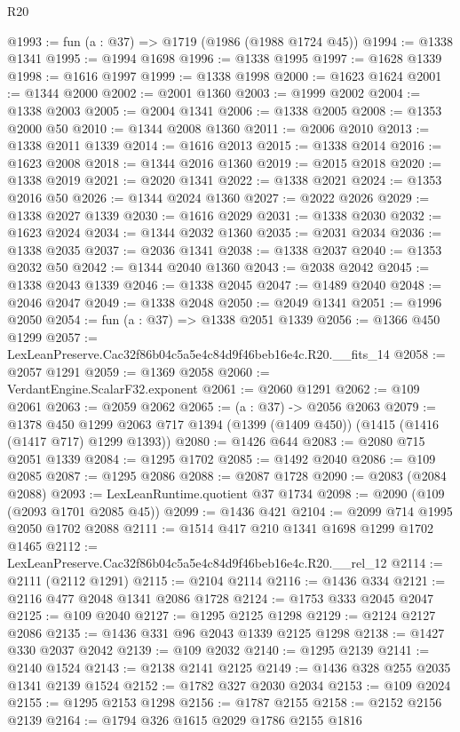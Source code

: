\begin{lexlean}{R20}
\begin{coremodule}
@1993 := fun (a : @37) => @1719 (@1986 (@1988 @1724 @45))
@1994 := @1338 @1341
@1995 := @1994 @1698
@1996 := @1338 @1995
@1997 := @1628 @1339
@1998 := @1616 @1997
@1999 := @1338 @1998
@2000 := @1623 @1624
@2001 := @1344 @2000
@2002 := @2001 @1360
@2003 := @1999 @2002
@2004 := @1338 @2003
@2005 := @2004 @1341
@2006 := @1338 @2005
@2008 := @1353 @2000 @50
@2010 := @1344 @2008 @1360
@2011 := @2006 @2010
@2013 := @1338 @2011 @1339
@2014 := @1616 @2013
@2015 := @1338 @2014
@2016 := @1623 @2008
@2018 := @1344 @2016 @1360
@2019 := @2015 @2018
@2020 := @1338 @2019
@2021 := @2020 @1341
@2022 := @1338 @2021
@2024 := @1353 @2016 @50
@2026 := @1344 @2024 @1360
@2027 := @2022 @2026
@2029 := @1338 @2027 @1339
@2030 := @1616 @2029
@2031 := @1338 @2030
@2032 := @1623 @2024
@2034 := @1344 @2032 @1360
@2035 := @2031 @2034
@2036 := @1338 @2035
@2037 := @2036 @1341
@2038 := @1338 @2037
@2040 := @1353 @2032 @50
@2042 := @1344 @2040 @1360
@2043 := @2038 @2042
@2045 := @1338 @2043 @1339
@2046 := @1338 @2045
@2047 := @1489 @2040
@2048 := @2046 @2047
@2049 := @1338 @2048
@2050 := @2049 @1341
@2051 := @1996 @2050
@2054 := fun (a : @37) => @1338 @2051 @1339
@2056 := @1366 @450 @1299
@2057 := LexLeanPreserve.Cac32f86b04c5a5e4c84d9f46beb16e4c.R20.__fits_14
@2058 := @2057 @1291
@2059 := @1369 @2058
@2060 := VerdantEngine.ScalarF32.exponent
@2061 := @2060 @1291
@2062 := @109 @2061
@2063 := @2059 @2062
@2065 := (a : @37) -> @2056 @2063
@2079 := @1378
    @450
    @1299
    @2063
    @717
    @1394
    (@1399 (@1409 @450))
    (@1415 (@1416 (@1417 @717) @1299 @1393))
@2080 := @1426 @644
@2083 := @2080 @715 @2051 @1339
@2084 := @1295 @1702
@2085 := @1492 @2040
@2086 := @109 @2085
@2087 := @1295 @2086
@2088 := @2087 @1728
@2090 := @2083 (@2084 @2088)
@2093 := LexLeanRuntime.quotient @37 @1734
@2098 := @2090 (@109 (@2093 @1701 @2085 @45))
@2099 := @1436 @421
@2104 := @2099 @714 @1995 @2050 @1702 @2088
@2111 := @1514 @417 @210 @1341 @1698 @1299 @1702 @1465
@2112 := LexLeanPreserve.Cac32f86b04c5a5e4c84d9f46beb16e4c.R20.__rel_12
@2114 := @2111 (@2112 @1291)
@2115 := @2104 @2114
@2116 := @1436 @334
@2121 := @2116 @477 @2048 @1341 @2086 @1728
@2124 := @1753 @333 @2045 @2047
@2125 := @109 @2040
@2127 := @1295 @2125 @1298
@2129 := @2124 @2127 @2086
@2135 := @1436 @331 @96 @2043 @1339 @2125 @1298
@2138 := @1427 @330 @2037 @2042
@2139 := @109 @2032
@2140 := @1295 @2139
@2141 := @2140 @1524
@2143 := @2138 @2141 @2125
@2149 := @1436 @328 @255 @2035 @1341 @2139 @1524
@2152 := @1782 @327 @2030 @2034
@2153 := @109 @2024
@2155 := @1295 @2153 @1298
@2156 := @1787 @2155
@2158 := @2152 @2156 @2139
@2164 := @1794 @326 @1615 @2029 @1786 @2155 @1816

\end{coremodule}
\end{lexlean}
